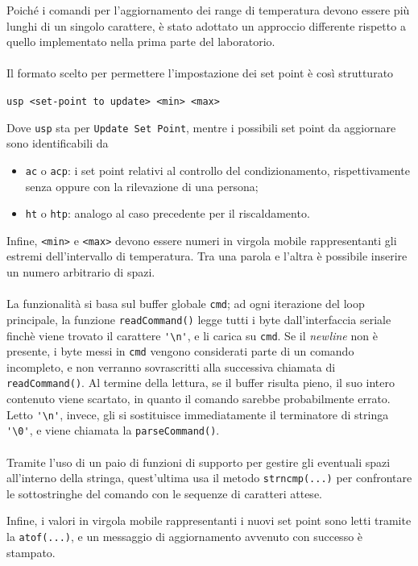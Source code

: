 \documentclass[12pt,a4paper]{article}
\begin{document}
Poiché i comandi per l'aggiornamento dei range di temperatura devono essere più lunghi di un singolo carattere, è stato adottato un approccio differente rispetto a quello implementato nella prima parte del laboratorio.
\\ \\
Il formato scelto per permettere l'impostazione dei set point è così strutturato
\begin{center}
    \verb|usp <set-point to update> <min> <max>|
\end{center}
Dove \verb|usp| sta per \verb|Update Set Point|, mentre i possibili set point da aggiornare sono identificabili da
\begin{itemize}
    \item \verb|ac| o \verb|acp|: i set point relativi al controllo del condizionamento, rispettivamente senza oppure con la rilevazione di una persona;
    \item \verb|ht| o \verb|htp|: analogo al caso precedente per il riscaldamento.
\end{itemize}
Infine, \verb|<min>| e \verb|<max>| devono essere numeri in virgola mobile rappresentanti gli estremi dell'intervallo di temperatura. Tra una parola e l'altra è possibile inserire un numero arbitrario di spazi.
\\ \\
La funzionalità si basa sul buffer globale \verb|cmd|; ad ogni iterazione del loop principale, la funzione \verb|readCommand()| legge tutti i byte dall'interfaccia seriale finchè viene trovato il carattere \verb|'\n'|, e li carica su \verb|cmd|. Se il \textit{newline} non è presente, i byte messi in \verb|cmd| vengono considerati parte di un comando incompleto, e non verranno sovrascritti alla successiva chiamata di \verb|readCommand()|. Al termine della lettura, se il buffer risulta pieno, il suo intero contenuto viene scartato, in quanto il comando sarebbe probabilmente errato. Letto \verb|'\n'|, invece, gli si sostituisce immediatamente il terminatore di stringa \verb|'\0'|, e viene chiamata la \verb|parseCommand()|.
\\ \\
Tramite l'uso di un paio di funzioni di supporto per gestire gli eventuali spazi all'interno della stringa, quest'ultima usa il metodo \verb|strncmp(...)| per confrontare le sottostringhe del comando con le sequenze di caratteri attese.

Infine, i valori in virgola mobile rappresentanti i nuovi set point sono letti tramite la \verb|atof(...)|, e un messaggio di aggiornamento avvenuto con successo è stampato.
\end{document}
